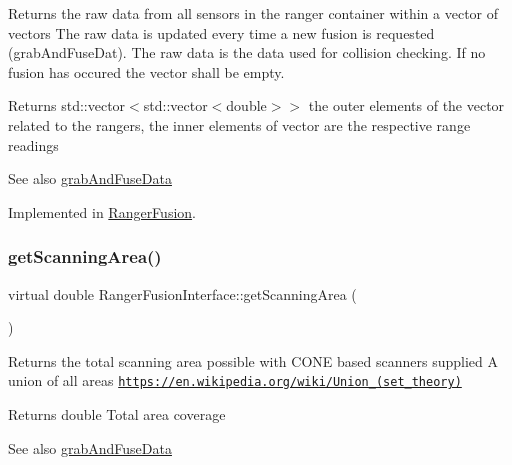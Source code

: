 Returns the raw data from all sensors in the ranger container within a vector of vectors The raw data is updated every time a new fusion is requested (grab\+And\+Fuse\+Dat). The raw data is the data used for collision checking. If no fusion has occured the vector shall be empty. 

\begin{DoxyReturn}{Returns}
std\+::vector$<$std\+::vector$<$double$>$$>$ the outer elements of the vector related to the rangers, the inner elements of vector are the respective range readings
\end{DoxyReturn}
\begin{DoxySeeAlso}{See also}
\hyperlink{classRangerFusionInterface_ada6afdab2ce6d58a1bd0134f5e2be23f}{grab\+And\+Fuse\+Data} 
\end{DoxySeeAlso}


Implemented in \hyperlink{classRangerFusion_a5780383fdffe121a7a2372a047819ba9}{Ranger\+Fusion}.

\mbox{\label{classRangerFusionInterface_a65155605804376da4f67baf3c6f97f40}} 
\subsubsection{\texorpdfstring{get\+Scanning\+Area()}{getScanningArea()}}
{\footnotesize\ttfamily virtual double Ranger\+Fusion\+Interface\+::get\+Scanning\+Area (\begin{DoxyParamCaption}{ }\end{DoxyParamCaption})\hspace{0.3cm}{\ttfamily [pure virtual]}}



Returns the total scanning area possible with C\+O\+NE based scanners supplied A union of all areas \href{https://en.wikipedia.org/wiki/Union_(set_theory)}{\tt https\+://en.\+wikipedia.\+org/wiki/\+Union\+\_\+(set\+\_\+theory)} 

\begin{DoxyReturn}{Returns}
double Total area coverage
\end{DoxyReturn}
\begin{DoxySeeAlso}{See also}
\hyperlink{classRangerFusionInterface_ada6afdab2ce6d58a1bd0134f5e2be23f}{grab\+And\+Fuse\+Data} 
\end{DoxySeeAlso}


